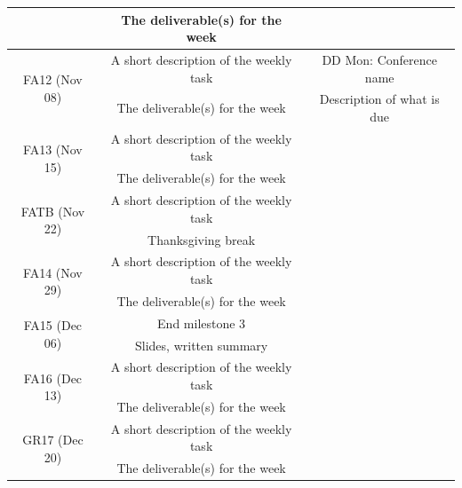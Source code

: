 \documentclass[letterpaper,11pt]{article}
\begin{document}
\begin{center}
\begin{tabular}{c|c|c}
  	                             & The deliverable(s) for the week & \\
	\hline
	\multirow{2}{*}{FA12 (Nov 08)} & A short description of the weekly task & DD Mon: Conference name \\
  	                             & The deliverable(s) for the week & Description of what is due \\
	\hline
	\multirow{2}{*}{FA13 (Nov 15)} & A short description of the weekly task & \\
  	                             & The deliverable(s) for the week & \\
	\hline
	\multirow{2}{*}{FATB (Nov 22)} & A short description of the weekly task & \\
  	                             & Thanksgiving break & \\
	\hline
	\multirow{2}{*}{FA14 (Nov 29)} & A short description of the weekly task & \\
  	                             & The deliverable(s) for the week & \\
	\hline
	\multirow{2}{*}{FA15 (Dec 06)} & End milestone 3 & \\
  	                             & Slides, written summary & \\
	\hline
	\multirow{2}{*}{FA16 (Dec 13)} & A short description of the weekly task & \\
  	                             & The deliverable(s) for the week & \\
	\hline
	\multirow{2}{*}{GR17 (Dec 20)} & A short description of the weekly task & \\
  	                             & The deliverable(s) for the week & \\
\end{tabular}
\end{center}
\end{document}
